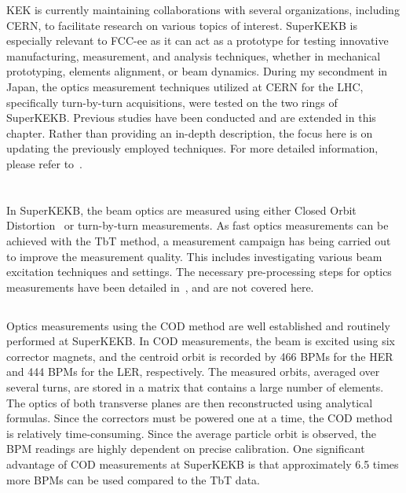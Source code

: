 KEK is currently maintaining collaborations with several organizations, including CERN, to
facilitate research on various topics of interest. SuperKEKB is especially relevant to FCC-ee as it
can act as a prototype for testing innovative manufacturing, measurement, and analysis techniques,
whether in mechanical prototyping, elements alignment, or beam dynamics. During my secondment in
Japan, the optics measurement techniques utilized at CERN for the LHC, specifically turn-by-turn
acquisitions, were tested on the two rings of SuperKEKB. 
Previous studies have been conducted and are extended in this chapter. Rather than providing an
in-depth description, the focus here is on updating the previously employed techniques. For more
detailed information, please refer
to~\cite{keintzel_jacqueline_beam_2022,keintzel_superkekb_2021,keintzel_impact_2021}.


\section{}

In SuperKEKB, the beam optics are measured using either Closed Orbit
Distortion~\cite{ohnishi_optics_1999} or turn-by-turn measurements. As fast optics measurements can
be achieved with the TbT method, a measurement campaign has being carried out to improve the
measurement quality. This includes investigating various beam excitation techniques and settings.
The necessary pre-processing steps for optics measurements have been detailed
in~\cite{keintzel_jacqueline_beam_2022}, and are not covered here.


\subsection{}

Optics measurements using the COD method
\cite{harrison_global_1987,chung_measurement_1993,ohnishi_optics_1999} are well established and
routinely performed at SuperKEKB. In COD measurements, the beam is excited using six corrector
magnets, and the centroid orbit is recorded by 466 BPMs for the HER and 444 BPMs for the LER,
respectively. The measured orbits, averaged over several turns, are stored in a matrix that contains
a large number of elements. The optics of both transverse planes are then reconstructed using
analytical formulas. Since the correctors must be powered one at a time, the COD method is
relatively time-consuming. 
Since the average particle orbit is observed, the BPM readings are highly dependent on precise
calibration. One significant advantage of COD measurements at SuperKEKB is that approximately 6.5
times more BPMs can be used compared to the TbT data.


